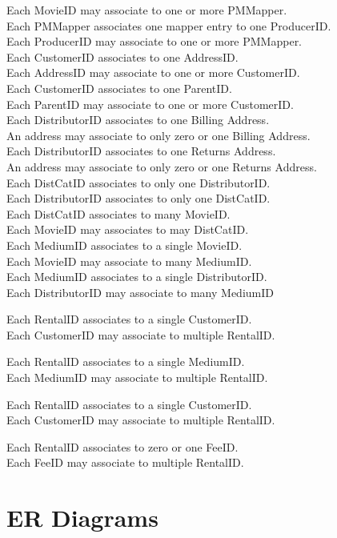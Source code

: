 \documentclass[letterpaper,12pt]{article}
\begin{document}
Each MovieID may associate to one or more PMMapper.
\\
Each PMMapper associates one mapper entry to one ProducerID.\\
Each ProducerID may associate to one or more PMMapper.
\\
Each CustomerID associates to one AddressID.\\
Each AddressID may associate to one or more CustomerID.
\\
Each CustomerID associates to one ParentID.\\
Each ParentID may associate to one or more CustomerID.
\\
Each DistributorID associates to one Billing Address.\\
An address may associate to only zero or one Billing Address.
\\
Each DistributorID associates to one Returns Address.\\
An address may associate to only zero or one Returns Address.
\\
Each DistCatID associates to only one DistributorID.\\
Each DistributorID associates to only one DistCatID.
\\
Each DistCatID associates to many MovieID.\\
Each MovieID may associates to may DistCatID.
\\
Each MediumID associates to a single MovieID.\\
Each MovieID may associate to many MediumID.
\\
Each MediumID associates to a single DistributorID.\\
Each DistributorID may associate to many MediumID

Each RentalID associates to a single CustomerID.\\
Each CustomerID may associate to multiple RentalID.

Each RentalID associates to a single MediumID.\\
Each MediumID may associate to multiple RentalID.

Each RentalID associates to a single CustomerID.\\
Each CustomerID may associate to multiple RentalID.

Each RentalID associates to zero or one  FeeID.\\
Each FeeID may associate to multiple RentalID.
\section{ER Diagrams}
\end{document}
